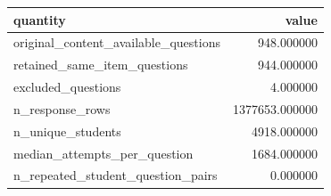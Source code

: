 \begin{tabular}{lr}
\toprule
quantity & value \\
\midrule
original\_content\_available\_questions & 948.000000 \\
retained\_same\_item\_questions & 944.000000 \\
excluded\_questions & 4.000000 \\
n\_response\_rows & 1377653.000000 \\
n\_unique\_students & 4918.000000 \\
median\_attempts\_per\_question & 1684.000000 \\
n\_repeated\_student\_question\_pairs & 0.000000 \\
\bottomrule
\end{tabular}
